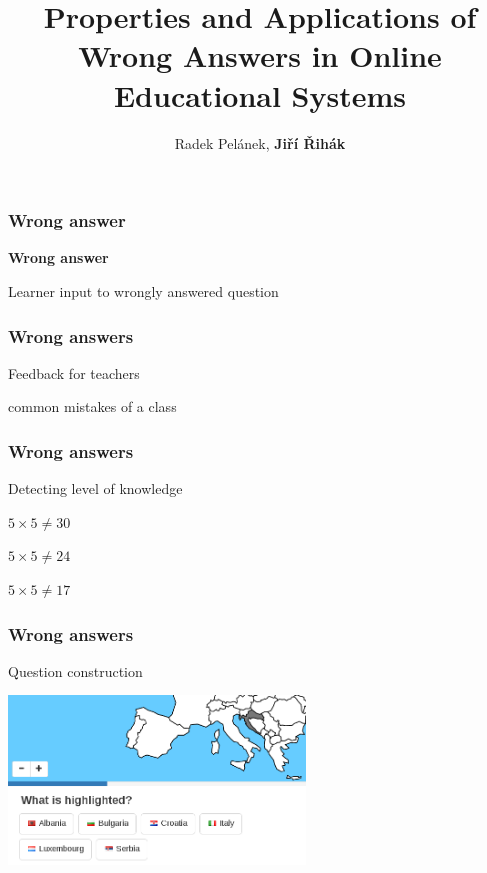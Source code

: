 \documentclass[xcolor=svgnames]{beamer}
\title[Wrong Answers]{Properties and Applications of Wrong Answers in Online Educational Systems}
\author{Radek Pelánek, \textbf{Ji\v{r}í \v{R}ihák}}
\institute{Masaryk University Brno}
\date{}
\begin{document}
\frame[plain]{\titlepage}
\begin{frame}
    \frametitle{Wrong answer}
    \centering
    \LARGE

    \textbf{Wrong answer}
    \vfill

    Learner input to wrongly answered question
\end{frame}
\begin{frame}
    \frametitle{Wrong answers}
    \centering
    \LARGE
    Feedback for teachers

    \vfill
    \large
    common mistakes of a class
\end{frame}
\begin{frame}
    \frametitle{Wrong answers}
    \centering
    \LARGE
    Detecting level of knowledge
    \vfill

    $ 5 \times 5 \neq 30$

    $ 5 \times 5 \neq 24$

    $ 5 \times 5 \neq 17$

\end{frame}
\begin{frame}
    \frametitle{Wrong answers}
    \centering
    \LARGE
    Question construction

    \vfill
    \includegraphics[height=4.5cm]{figures/question.png}
\end{frame}
\end{document}
